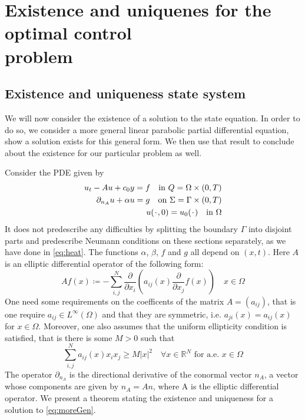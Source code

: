 \section{Existence and uniquenes for the optimal control\\\mbox{problem}}\label{proof}

\subsection{Existence and uniqueness state system}
We will now consider the existence of a solution to the state equation. In order to do so, we consider a more general linear parabolic partial differential equation, show a solution exists for this general form. We then use that result to conclude about the existence for our particular problem as well.

Consider the PDE given by
%
\begin{align}
    \label{eq:moreGen}
    u_t - Au + c_0 y = f \quad \text{in } Q = \Omega \times (0,T) \\
    \label{eq:moreGen2}\partial_{n_A} u + \alpha u = g \quad \text{on } \Sigma = \Gamma \times (0,T) \\
    u(\placeholder,0) = u_0(\placeholder) \quad \text{in } \Omega
\end{align}
It does not predescribe any difficulties by splitting the boundary $\Gamma$ into disjoint parts
and predescribe Neumann conditions on these sections separately, as we have done in \ref{eq:heat}. The functions $\alpha$, $\beta$, $f$ and $g$ all depend on $(x,t)$. Here $A$ is an elliptic differential operator of the following form:
%
\begin{equation*}
    Af(x) \coloneqq -\sum_{i,j}^N\frac{\partial}{\partial x_i}(a_{ij}(x)\frac{\partial}{\partial x_j}f(x)) \quad x\in \Omega
\end{equation*}
One need some requirements on the coefficents of the matrix $A=(a_{ij})$, that is one require $a_{ij} \in L^{\infty}(\Omega)$ and that they are symmetric, i.e. $a_{ji}(x) = a_{ij}(x)$ for $x\in \Omega$. Moreover, one also assumes that the uniform ellipticity condition is satisfied, that is there is some $M > 0$ such that 
\begin{equation*}
    \label{eq:uniformEl}
    \sum_{i,j}^N a_{ij}(x)x_i x_j \geq M|x|^2 \quad \forall x \in \mathbb{R}^N \text{ for a.e. $x\in \Omega$}
\end{equation*}
The operator $\partial_{n_A}$ is the directional derivative of the conormal vector $n_{A}$, a vector whose components are given by $n_{A} = An$, where A is the elliptic differential operator. We present a theorem stating the existence and uniqueness for a solution to \eqref{eq:moreGen}. 

